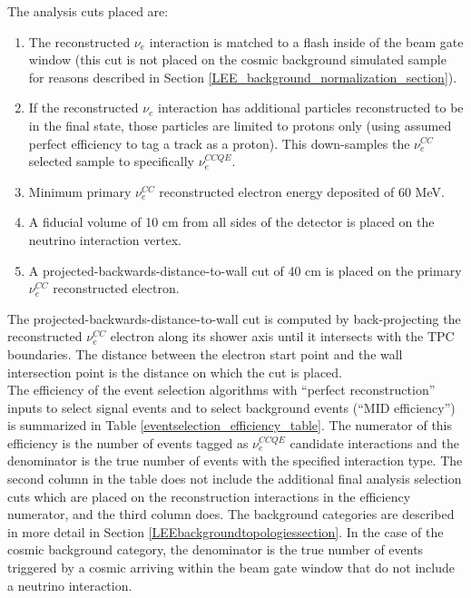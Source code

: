 The analysis cuts placed are:
\begin{enumerate}
\item The reconstructed $\nu_e$ interaction is matched to a flash inside of the beam gate window (this cut is not placed on the cosmic background simulated sample for reasons described in Section \ref{LEE_background_normalization_section}).
\item If the reconstructed $\nu_e$ interaction has additional particles reconstructed to be in the final state, those particles are limited to protons only (using assumed perfect efficiency to tag a track as a proton). This down-samples the $\nu_e^{CC}$ selected sample to specifically $\nu_e^{CCQE}$.
\item Minimum primary $\nu_e^{CC}$ reconstructed electron energy deposited of 60 MeV.
\item A fiducial volume of 10 cm from all sides of the detector is placed on the neutrino interaction vertex.
\item A projected-backwards-distance-to-wall cut of 40 cm is placed on the primary $\nu_e^{CC}$ reconstructed electron.
\end{enumerate}
The projected-backwards-distance-to-wall cut is computed by back-projecting the reconstructed $\nu_e^{CC}$ electron along its shower axis until it intersects with the TPC boundaries. The distance between the electron start point and the wall intersection point is the distance on which the cut is placed.\\


The efficiency of the event selection algorithms with ``perfect reconstruction'' inputs to select signal events and to select background events (``MID efficiency'') is summarized in Table \ref{eventselection_efficiency_table}. The numerator of this efficiency is the number of events tagged as $\nu_e^{CCQE}$ candidate interactions and the denominator is the true number of events with the specified interaction type. The second column in the table does not include the additional final analysis selection cuts which are placed on the reconstruction interactions in the efficiency numerator, and the third column does. The background categories are described in more detail in Section \ref{LEEbackgroundtopologiessection}. In the case of the cosmic background category, the denominator is the true number of events triggered by a cosmic arriving within the beam gate window that do not include a neutrino interaction.\\


